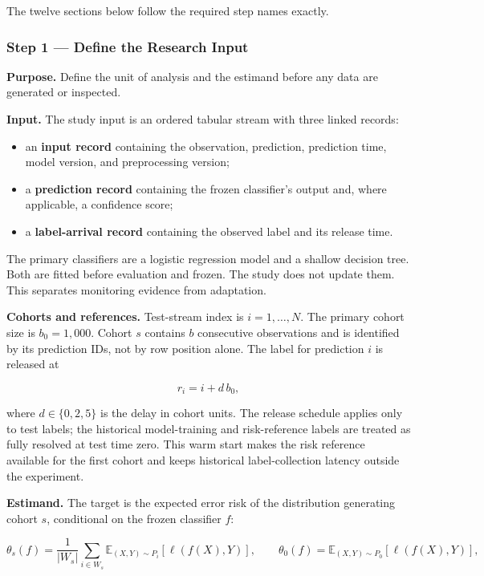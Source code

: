 \documentclass[
]{article}
\providecommand{\tightlist}{%
  \setlength{\itemsep}{0pt}\setlength{\parskip}{0pt}}
\begin{document}
The twelve sections below follow the required step names exactly.

\hypertarget{step-1-define-the-research-input}{%
\subsubsection{Step 1 --- Define the Research
Input}\label{step-1-define-the-research-input}}

\textbf{Purpose.} Define the unit of analysis and the estimand before
any data are generated or inspected.

\textbf{Input.} The study input is an ordered tabular stream with three
linked records:

\begin{itemize}
\tightlist
\item
  an \textbf{input record} containing the observation, prediction,
  prediction time, model version, and preprocessing version;
\item
  a \textbf{prediction record} containing the frozen classifier's output
  and, where applicable, a confidence score;
\item
  a \textbf{label-arrival record} containing the observed label and its
  release time.
\end{itemize}

The primary classifiers are a logistic regression model and a shallow
decision tree. Both are fitted before evaluation and frozen. The study
does not update them. This separates monitoring evidence from
adaptation.

\textbf{Cohorts and references.} Test-stream index is \(i=1,\ldots,N\).
The primary cohort size is \(b_0=1{,}000\). Cohort \(s\) contains \(b\)
consecutive observations and is identified by its prediction IDs, not by
row position alone. The label for prediction \(i\) is released at

\[
r_i = i + d\,b_0,
\]

where \(d\in\{0,2,5\}\) is the delay in cohort units. The release
schedule applies only to test labels; the historical model-training and
risk-reference labels are treated as fully resolved at test time zero.
This warm start makes the risk reference available for the first cohort
and keeps historical label-collection latency outside the experiment.

\textbf{Estimand.} The target is the expected error risk of the
distribution generating cohort \(s\), conditional on the frozen
classifier \(f\):

\[
\theta_s(f)=\frac{1}{|W_s|}\sum_{i\in W_s}\mathbb{E}_{(X,Y)\sim P_i}\left[\ell(f(X),Y)\right],
\qquad
\theta_0(f)=\mathbb{E}_{(X,Y)\sim P_0}\left[\ell(f(X),Y)\right],
\]
\end{document}
